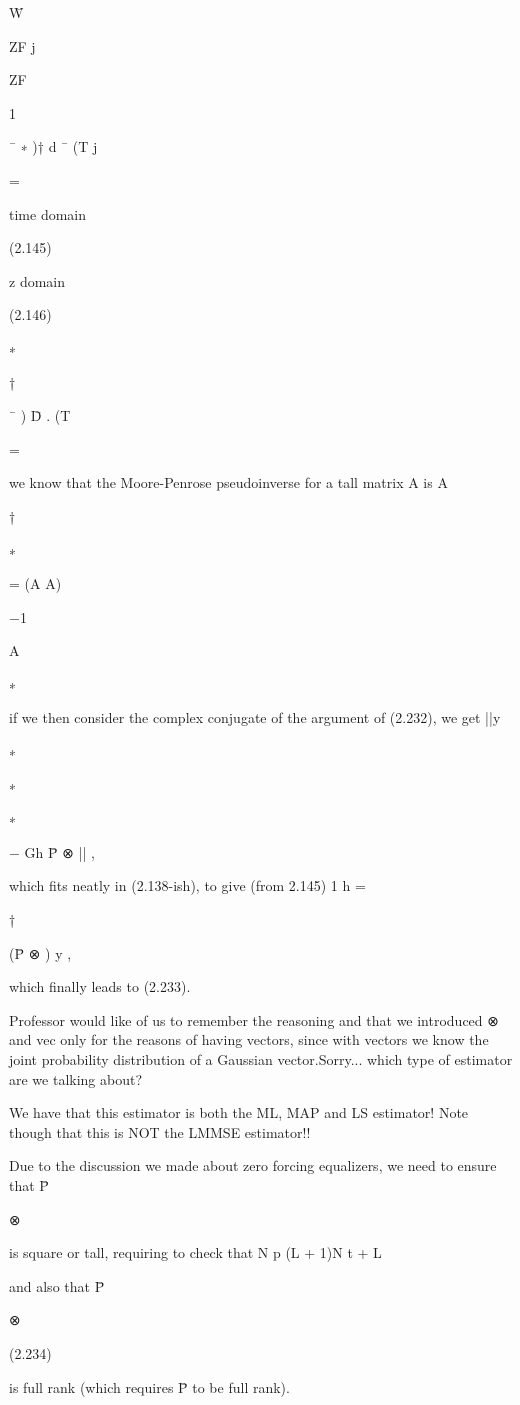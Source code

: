 {{{W̄

ZF j

ZF

1

¯ ∗ )† d
¯
(T j

=

time domain

(2.145)

z domain

(2.146)


∗

†

¯ ) D̄ .
(T

=
\sqrtG

we know that the Moore-Penrose pseudoinverse for a tall matrix A is A

†

∗

= (A A)

−1

A

∗

if we then consider the complex conjugate of the argument of (2.232), we get
||y

∗

∗

∗

− \sqrt Gh P̄ ⊗ || ,

which fits neatly in (2.138-ish), to give (from 2.145)
1 h =

†

(P̄ ⊗ ) y ,
\sqrtG

which finally leads to (2.233).

Professor would like of us to remember the reasoning and that we introduced ⊗ and vec only for the reasons of having vectors, since with vectors we know the joint probability distribution of a Gaussian vector.
​Sorry... which type of estimator are we talking about?

We have that this estimator is both the ML, MAP and LS estimator!
Note though that this is NOT the LMMSE estimator!!

Due to the discussion we made about zero forcing equalizers, we need to ensure that P̄

⊗

is square or tall, requiring to check that N p \geq (L + 1)N t + L

and also that P̄

⊗

(2.234)

is full rank (which requires P̄ to be full rank).

}}}
